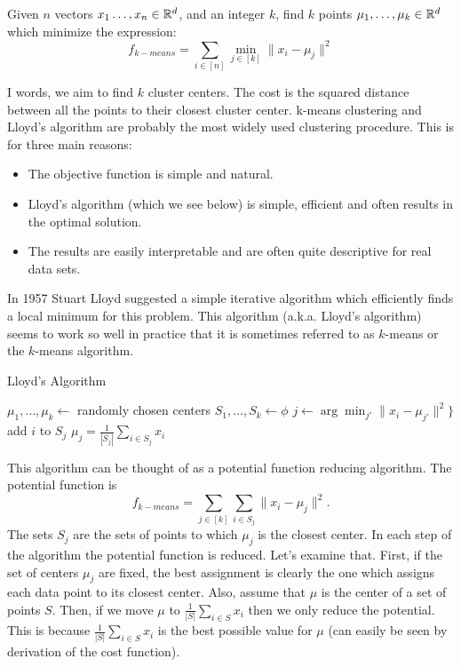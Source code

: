\documentclass{article}
\begin{document}



\begin{definition}[$k$-means]
Given $n$ vectors $x_1\ldots,x_n\in {\mathbb{R}}^d$, and an integer $k$, find $k$ points $\mu_1,\ldots,\mu_k \in {\mathbb{R}}^d$
which minimize the expression:
\[
f_{k-means} = \sum_{i \in [n]} \min_{j \in [k]} \|x_i - \mu_j \|^2
\]
\end{definition}
I words, we aim to find $k$ cluster centers. The cost is the squared distance between all the points to their closest cluster center.
k-means clustering and Lloyd's algorithm \cite{Lloyd82leastsquares} are probably the most widely used clustering procedure.
This is for three main reasons:
\begin{itemize} 
\item The objective function is simple and natural.
\item Lloyd's algorithm (which we see below) is simple, efficient and often results in the optimal solution.  
\item The results are easily interpretable and are often quite descriptive for real data sets. 
\end{itemize}
In 1957 Stuart Lloyd suggested a simple iterative algorithm which efficiently finds a local minimum for this problem.
This algorithm (a.k.a. Lloyd's algorithm) seems to work so well in practice that it is sometimes referred to as $k$-means or the $k$-means algorithm.

\begin{algorithm}
\caption{Lloyd's Algorithm}
\begin{algorithmic}
\STATE $\mu_1,\ldots,\mu_k \leftarrow$ randomly chosen centers
\STATE $S_1,\ldots,S_k \leftarrow \phi$
	\STATE $j \leftarrow \arg\min_{j'}\|x_i - \mu_{j'}\|^2 \}$
	\STATE add $i$ to $S_j$
\ENDFOR
{}
	\STATE $\mu_j = \frac{1}{|S_j|}\sum_{i \in S_j} x_i$
\ENDFOR
\ENDWHILE
\end{algorithmic}
\end{algorithm}
This algorithm can be thought of as a potential function reducing algorithm.
The potential function is 
\[
f_{k-means} = \sum_{j \in [k]} \sum_{i \in S_j} \|x_i - \mu_j\|^2.
\]
The sets $S_j$ are the sets of points to which $\mu_j$ is the closest center.
In each step of the algorithm the potential function is reduced.
Let's examine that.
First, if the set of centers $\mu_j$ are fixed, the best assignment is clearly the one which assigns
each data point to its closest center. Also, assume that $\mu$ is the center of a set of points $S$.
Then, if we move $\mu$ to $\frac{1}{|S|}\sum_{i \in S} x_i$ then we only reduce the potential.
This is because $\frac{1}{|S|}\sum_{i \in S} x_i$ is the best possible value for $\mu$ (can easily be seen by derivation of the cost function).
\end{document}
